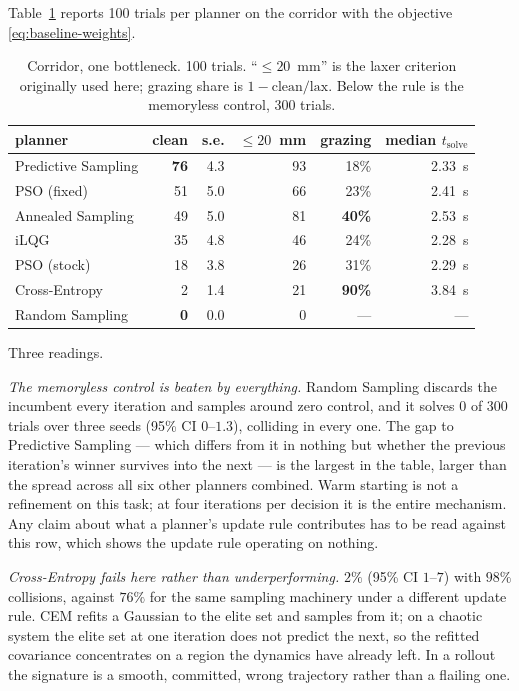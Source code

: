 \documentclass[conference]{IEEEtran}
\begin{document}
Table~\ref{tab:corridor} reports 100 trials per planner on the corridor with the
objective \eqref{eq:baseline-weights}.

\begin{table}[t]
\caption{Corridor, one bottleneck. 100 trials. ``$\leq 20$~mm'' is the laxer
criterion originally used here; grazing share is $1 - \text{clean}/\text{lax}$.
Below the rule is the memoryless control, 300 trials.}
\label{tab:corridor}
\centering
\begin{tabular}{@{}lrrrrr@{}}
\toprule
planner & clean & s.e. & $\leq 20$~mm & grazing & median $t_{\text{solve}}$ \\
\midrule
Predictive Sampling  & \textbf{76} & 4.3 & 93 & 18\% & 2.33~s \\
PSO (fixed)          & 51 & 5.0 & 66 & 23\% & 2.41~s \\
Annealed Sampling    & 49 & 5.0 & 81 & \textbf{40\%} & 2.53~s \\
iLQG                 & 35 & 4.8 & 46 & 24\% & 2.28~s \\
PSO (stock)          & 18 & 3.8 & 26 & 31\% & 2.29~s \\
Cross-Entropy        & 2 & 1.4 & 21 & \textbf{90\%} & 3.84~s \\
\midrule
Random Sampling      & \textbf{0} & 0.0 & 0 & --- & --- \\
\bottomrule
\end{tabular}
\end{table}

Three readings.

\emph{The memoryless control is beaten by everything.} Random Sampling discards
the incumbent every iteration and samples around zero control, and it solves $0$
of $300$ trials over three seeds (95\% CI $0$--$1.3$), colliding in every one.
The gap to Predictive Sampling --- which differs from it in nothing but whether
the previous iteration's winner survives into the next --- is the largest in the
table, larger than the spread across all six other planners combined. Warm
starting is not a refinement on this task; at four iterations per decision it is
the entire mechanism. Any claim about what a planner's update rule contributes
has to be read against this row, which shows the update rule operating on
nothing.

\emph{Cross-Entropy fails here rather than underperforming.} $2\%$
(95\% CI $1$--$7$) with $98\%$ collisions, against $76\%$ for the same sampling
machinery under a different
update rule. CEM refits a Gaussian to the elite set and samples from it; on a
chaotic system the elite set at one iteration does not predict the next, so the
refitted covariance concentrates on a region the dynamics have already left. In
a rollout the signature is a smooth, committed, wrong trajectory rather than a
flailing one.
\end{document}
